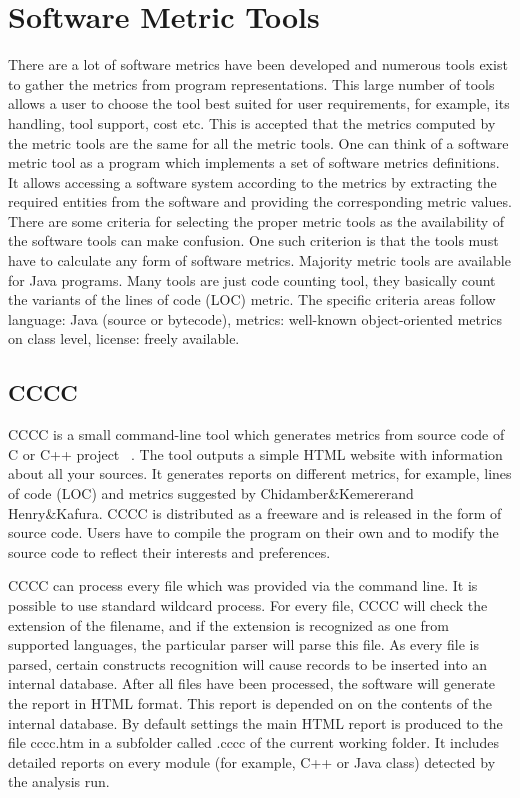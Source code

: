 \section{Software Metric Tools}
There are a lot of software metrics have been developed and numerous tools exist to gather the metrics from program representations. This large number of tools allows a user to choose the tool best suited for user requirements, for example, its handling, tool support, cost etc. This is accepted that the metrics computed by the metric tools are the same for all the metric tools. One can think of a software metric tool as a program which implements a set of software metrics definitions. It allows accessing a software system according to the metrics by extracting the required entities from the software and providing the corresponding metric values. There are
some criteria for selecting the proper metric tools as the availability of the software tools can make confusion. One such criterion is that the tools must have to calculate any form of software metrics. Majority metric tools are available for Java programs. Many tools are just code counting
tool, they basically count the variants of the lines of code (LOC) metric. The specific criteria areas follow language: Java (source or bytecode), metrics: well-known object-oriented metrics on class level, license: freely available.

\subsection{CCCC}

CCCC is a small command-line tool which generates metrics from source code of C or C++ project ~\cite{cccc}. The tool outputs a simple HTML website with information about all your sources. It generates reports on different metrics, for example, lines of code (LOC) and metrics suggested by Chidamber\&Kemererand Henry\&Kafura. CCCC is distributed as a freeware and is released in the form of source code. Users have to compile the program on their own and to modify the source code to reflect their interests and preferences.

CCCC can process every file which was provided via the command line. It is possible to use standard wildcard process. For every file, CCCC will check the extension of the filename, and if the extension is recognized as one from supported languages, the particular parser will parse this file. As every file is parsed, certain constructs recognition will cause records to be inserted into an internal database. After all files have been processed, the software will generate the report in HTML format. This report is depended on on the contents of the internal database. By default settings the main HTML report is produced to the file cccc.htm in a subfolder called .cccc of the current working folder. It includes detailed reports on every module (for example, C++ or Java class) detected by the analysis run.

